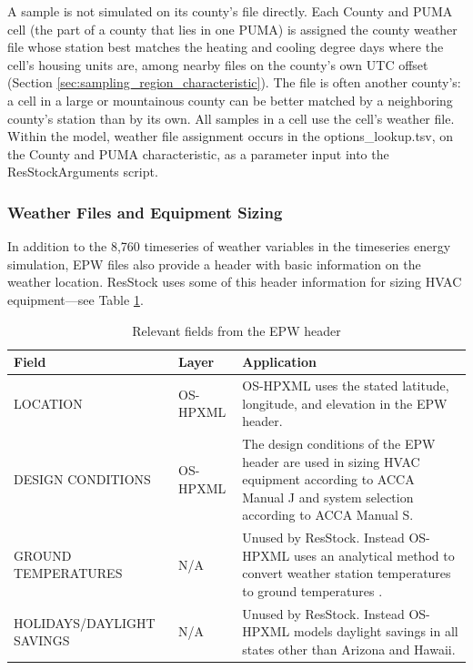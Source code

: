 A sample is not simulated on its county's file directly. Each County and PUMA cell (the part of a county that lies in one PUMA) is assigned the county weather file whose station best matches the heating and cooling degree days where the cell's housing units are, among nearby files on the county's own UTC offset (Section \ref{sec:sampling_region_characteristic}). The file is often another county's: a cell in a large or mountainous county can be better matched by a neighboring county's station than by its own. All samples in a cell use the cell's weather file. Within the model, weather file assignment occurs in the options\_lookup.tsv, on the County and PUMA characteristic, as a parameter input into the ResStockArguments script.

\subsubsection{Weather Files and Equipment Sizing}
In addition to the 8,760 timeseries of weather variables in the timeseries energy simulation, EPW files also provide a header with basic information on the weather location. ResStock uses some of this header information for sizing HVAC equipment---see Table \ref{Tab:Packages}.

\begin{table}[!h]
 \centering
    \caption{Relevant fields from the EPW header}
    \label{Tab:Packages}
    \begin{tabular}{llp{}}
      \toprule
      Field          & Layer & Application                                                                           \\
      \midrule
      LOCATION &     OS-HPXML &                  OS-HPXML uses the stated latitude, longitude, and elevation in the EPW header. \\
      DESIGN CONDITIONS  & OS-HPXML                      & The design conditions of the EPW header are used in sizing HVAC equipment according to ACCA Manual J and system selection according to ACCA Manual S.\\
      GROUND TEMPERATURES  & N/A                      & Unused by ResStock. Instead OS-HPXML uses an analytical method to convert weather station temperatures to ground temperatures \citep{Xing2014}. \\
      HOLIDAYS/DAYLIGHT SAVINGS  & N/A                           & Unused by ResStock. Instead OS-HPXML models daylight savings in all states other than Arizona and Hawaii. \\
      \bottomrule
    \end{tabular}
  \end{table}
